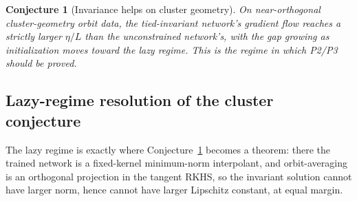 \documentclass[11pt]{article}
\theoremstyle{plain}
\newtheorem{conjecture}{Conjecture}
\theoremstyle{definition}
\theoremstyle{remark}
\begin{document}
\begin{conjecture}[Invariance helps on cluster geometry]\label{conj:cluster}
On near-orthogonal cluster-geometry orbit data, the tied-invariant network's gradient flow reaches a strictly larger $\eta/L$ than the unconstrained network's, with the gap growing as initialization moves toward the lazy regime.  This is the regime in which P2/P3 should be proved.
\end{conjecture}

\subsection{Lazy-regime resolution of the cluster conjecture}\label{sec:lazy-cluster}
The lazy regime is exactly where Conjecture~\ref{conj:cluster} becomes a theorem: there the trained network is a fixed-kernel minimum-norm interpolant, and orbit-averaging is an orthogonal projection in the tangent RKHS, so the invariant solution cannot have larger norm, hence cannot have larger Lipschitz constant, at equal margin.
\end{document}
